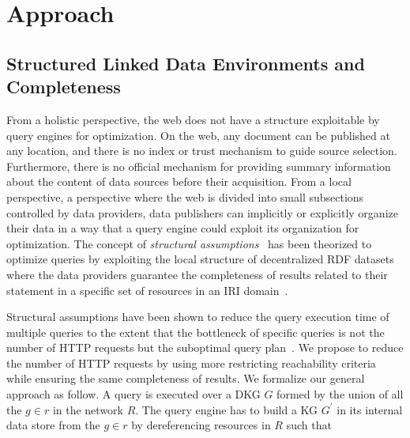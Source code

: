 \section{Approach}




\subsection{Structured Linked Data Environments and Completeness}\label{sec:slde}
From a holistic perspective, the web does not have a structure exploitable by query engines for optimization.
On the web, any document can be published at any location, and there is no index or trust mechanism to guide source selection.
Furthermore, there is no official mechanism for providing summary information about the content of data sources before their acquisition.
From a local perspective, a perspective where the web is divided into small subsections controlled by data providers, data publishers can implicitly or explicitly organize their data  
in a way that a query engine could exploit its organization for optimization.
The concept of \emph{structural assumptions}~\cite{Taelman2023} has been theorized to optimize queries by exploiting the local structure of decentralized RDF datasets where the data providers 
guarantee the completeness of results related to their statement in a specific set of resources in an IRI domain~\cite{Bogaerts2021LinkTW}.

Structural assumptions have been shown to reduce the query execution time of multiple queries to the extent that the bottleneck of specific queries is not the number of HTTP requests but the suboptimal query plan~\cite{Taelman2023, eschauzier_quweda_linkqueue_2023}.
We propose to reduce the number of HTTP requests by using more restricting reachability criteria~\cite{Hartig2012} while ensuring the same completeness of results.
We formalize our general approach as follow.
A query is executed over a DKG $G$ formed by the union of all the $g \in r$ in the network $R$.
The query engine has to build a KG $G^{\prime}$ in its internal data store from the  $g \in r$ by dereferencing resources in $R$ such that

